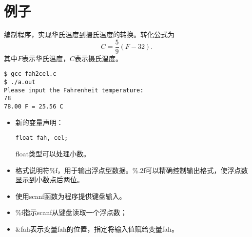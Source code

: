 \section{例子}

\begin{frame}[fragile]\ft{\secname}
  编制程序，实现华氏温度到摄氏温度的转换。转化公式为
  $$
  C = \frac59 (F-32).
  $$
  其中$F$表示华氏温度，$C$表示摄氏温度。
\end{frame}

\begin{frame}[fragile]\ft{\secname}


\end{frame}

\begin{frame}[fragile]\ft{\secname}

\begin{lstlisting}[backgroundcolor=\color{red!10}]
$ gcc fah2cel.c 
$ ./a.out
Please input the Fahrenheit temperature:
78
78.00 F = 25.56 C
\end{lstlisting}
\end{frame}


\begin{frame}[fragile]\ft{\secname}
\begin{itemize}
\item 新的变量声明：
\begin{lstlisting}
float fah, cel;
\end{lstlisting}
float类型可以处理小数。\\[0.1in]
\item 格式说明符\%f，用于输出浮点型数据。\%.2f可以精确控制输出格式，使浮点数显示到小数点后两位。\\[0.1in]
\item 使用scanf函数为程序提供键盘输入。
\item[] \%f指示scanf从键盘读取一个浮点数；
\item[] \&fah表示变量fah的位置，指定将输入值赋给变量fah。

\end{itemize}
\end{frame}


